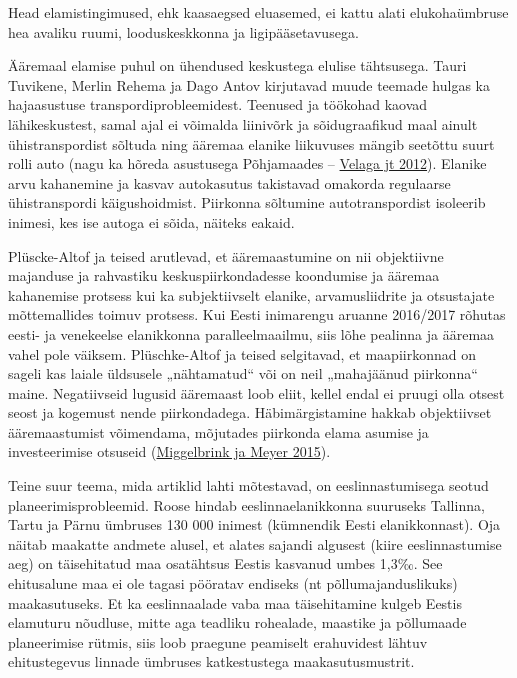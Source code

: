 \documentclass[estonian,]{article}
\begin{document}
\begin{blockquote-left}
Head elamistingimused, ehk kaasaegsed eluasemed, ei kattu alati
elukohaümbruse hea avaliku ruumi, looduskeskkonna ja ligipääsetavusega.
\end{blockquote-left}

Ääremaal elamise puhul on ühendused keskustega elulise tähtsusega. Tauri Tuvikene, Merlin Rehema ja Dago Antov kirjutavad muude teemade hulgas ka hajaasustuse transpordiprobleemidest. Teenused ja töökohad kaovad lähikeskustest, samal ajal ei võimalda liinivõrk ja sõidugraafikud maal ainult ühistranspordist sõltuda ning ääremaa elanike liikuvuses mängib seetõttu suurt rolli auto (nagu ka hõreda asustusega Põhjamaades -- \protect\hyperlink{Velaga2012}{Velaga jt 2012}). Elanike arvu kahanemine ja kasvav autokasutus takistavad omakorda regulaarse ühistranspordi käigushoidmist. Piirkonna sõltumine autotranspordist isoleerib inimesi, kes ise autoga ei sõida, näiteks eakaid.

Plüscke-Altof ja teised arutlevad, et ääremaastumine on nii objektiivne majanduse ja rahvastiku keskuspiirkondadesse koondumise ja ääremaa kahanemise protsess kui ka subjektiivselt elanike, arvamusliidrite ja otsustajate mõttemallides toimuv protsess. Kui Eesti inimarengu aruanne 2016/2017 rõhutas eesti- ja venekeelse elanikkonna paralleelmaailmu, siis lõhe pealinna ja ääremaa vahel pole väiksem. Plüschke-Altof ja teised selgitavad, et maapiirkonnad on sageli kas laiale üldsusele „nähtamatud`` või on neil „mahajäänud piirkonna`` maine. Negatiivseid lugusid ääremaast loob eliit, kellel endal ei pruugi olla otsest seost ja kogemust nende piirkondadega. Häbimärgistamine hakkab objektiivset ääremaastumist võimendama, mõjutades piirkonda elama asumise ja investeerimise otsuseid (\protect\hyperlink{Miggelbrink2015}{Miggelbrink ja Meyer 2015}).

Teine suur teema, mida artiklid lahti mõtestavad, on eeslinnastumisega seotud planeerimisprobleemid. Roose hindab eeslinnaelanikkonna suuruseks Tallinna, Tartu ja Pärnu ümbruses 130 000 inimest (kümnendik Eesti elanikkonnast). Oja näitab maakatte andmete alusel, et alates sajandi algusest (kiire eeslinnastumise aeg) on täisehitatud maa osatähtsus Eestis kasvanud umbes 1,3‰. See ehitusalune maa ei ole tagasi pööratav endiseks (nt põllumajanduslikuks) maakasutuseks. Et ka eeslinnaalade vaba maa täisehitamine kulgeb Eestis elamuturu nõudluse, mitte aga teadliku rohealade, maastike ja põllumaade planeerimise rütmis, siis loob praegune peamiselt erahuvidest lähtuv ehitustegevus linnade ümbruses katkestustega maakasutusmustrit.
\end{document}
